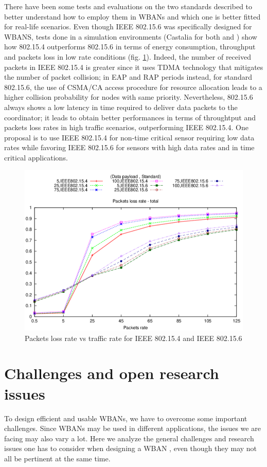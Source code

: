\documentclass[conference]{IEEEtran}
\begin{document}
There have been some tests and evaluations on the two standards described to better understand how to employ them in WBANs and which one is better fitted for real-life scenarios. 
Even though IEEE 802.15.6 was specifically designed for WBANS, tests done in a simulation environments (Castalia for both \cite{nabila2019qos} and \cite{toumanari2014performance}) show how 802.15.4 outperforms 802.15.6 in terms of  energy consumption, throughput and packets loss in low rate conditions (fig. \ref{grafico}). Indeed, the number of received packets in IEEE 802.15.4 is greater since it uses TDMA technology that mitigates the number of packet collision; in EAP and RAP periods instead, for standard 802.15.6, the use of CSMA/CA access procedure for resource allocation leads to a higher collision probability for nodes with same priority.
Nevertheless, 802.15.6 always shows a low latency in time required to deliver data packets to the coordinator; it leads to obtain better performances in terms of throughtput and packets loss rates in high traffic scenarios, outperforming IEEE 802.15.4. 
\newline One proposal \cite{nabila2019qos} is to use IEEE 802.15.4 for non-time critical sensor requiring low data rates while favoring IEEE 802.15.6 for sensors with high data rates and in time critical applications. 

\begin{figure}[htbp]
	\centering
	\includegraphics[width=0.9\linewidth]{img/grafico.png}
	\caption{Packets loss rate vs traffic rate for IEEE 802.15.4 and IEEE 802.15.6}
	\label{grafico}
\end{figure}

\section{Challenges and open research issues}
To design efficient and usable WBANs, we have to overcome some important challenges. Since WBANs may be used in different applications, the issues we are facing may also vary a lot. Here we analyze the general challenges and research issues one has to consider when designing a WBAN \cite{cao2009enabling}, even though they may not all be pertinent at the same time.
\end{document}
